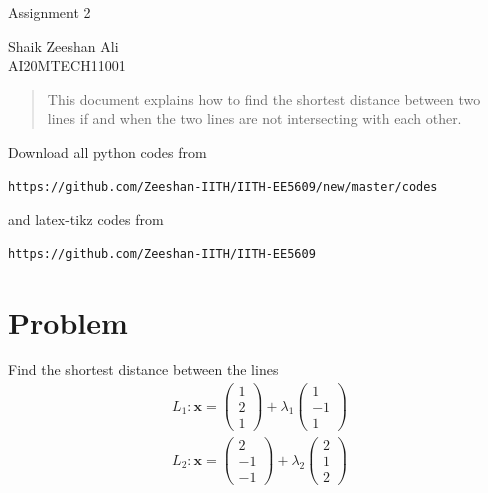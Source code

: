 \documentclass[journal,12pt,twocolumn]{IEEEtran}
\newcommand{\myvec}[1]{\ensuremath{\begin{pmatrix}#1\end{pmatrix}}}
\numberwithin{equation}{subsection}
\let\vec\mathbf
\begin{document}
\begin{center}
\huge Assignment 2

\large Shaik Zeeshan Ali\\
AI20MTECH11001
\end{center}
\begin{abstract}
This document explains how to find the shortest distance between two lines if and when the two lines are not intersecting with each other.
\end{abstract}
Download all python codes from 
\begin{lstlisting}
https://github.com/Zeeshan-IITH/IITH-EE5609/new/master/codes
\end{lstlisting}

and latex-tikz codes from 
\begin{lstlisting}
https://github.com/Zeeshan-IITH/IITH-EE5609
\end{lstlisting}

\section{Problem}
Find the shortest distance between the lines 
\begin{align}
    L_1\colon \vec{x}=\myvec{1\\2\\1}+\lambda_1\myvec{1\\-1\\1}\\
    L_2\colon \vec{x}=\myvec{2\\-1\\-1}+\lambda_2\myvec{2\\1\\2}
\end{align}
\end{document}
